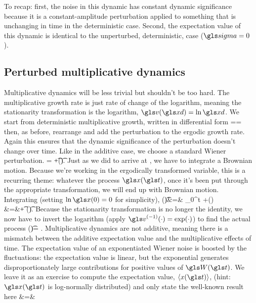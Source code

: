 To recap: first, the noise in this dynamic has constant dynamic significance because it is a constant-amplitude perturbation applied to 
something that is unchanging in time in the deterministic case. Second, the expectation value of this dynamic is identical to 
the unperturbed, deterministic, case ($\gsigma=0$).

\subsection{Perturbed multiplicative dynamics} 
Multiplicative dynamics will be less trivial but shouldn't be too hard. 
The multiplicative growth rate is just rate of change of the logarithm, meaning the stationarity transformation is the logarithm, $\gv(\xd)=\ln \xd$.
We start from deterministic multiplicative growth, written in differential form
\be
\gexp=\frac{\gd\ln \xd}{\gd\t}=\ggamma
{}
\ee
then, as before, rearrange and add the perturbation to the ergodic growth rate. Again this 
ensures that the dynamic significance of the perturbation doesn't change over time.
Like in the additive case, we choose a standard Wiener perturbation.
\bea
\gd \ln \x= \ggamma  \gd\t +\gsigma \gd \gW(\t).
\eea
Just as we did to arrive at , we have to integrate a Brownian motion. Because we're 
working in the ergodically transformed variable, this is a recurring theme: whatever the process 
$\x(\t)$, once it's been put through the appropriate transformation, we will end up with Brownian 
motion. Integrating  (setting $\ln \x(0)=0$ for simplicity),
\bea
\ln \x(\t)&=& \int_0^t \ggamma  \gd\gs +\gsigma \gd \gW(\gs)\\
&=&\ggamma \t + \gsigma \gW(\t).
\eea
Because the stationarity transformation is no longer the identity, we now have to invert the 
logarithm (apply $\gv^{(-1)}(\cdot)=\exp(\cdot)$) to find the actual process
\bea
\x(\t)= \exp\left[\ggamma \t + \gsigma \gW(\t)\right].
\eea
Multiplicative dynamics are not additive, meaning there is a mismatch between the additive 
expectation value and the multiplicative effects of time. The expectation value of an 
exponentiated Wiener noise is boosted by the fluctuations: the expectation value is linear, 
but the exponential generates disproportionately large contributions for positive values of 
$\gW(\t)$. We leave it as an exercise to compute the expectation value, $\ave{x(\t)}$, 
(hint: $\x(\t)$ is log-normally distributed) and only state the well-known result here
\bea
\ave{\x(\t)}&=&\ave{\exp\left[\ggamma \t + \gsigma \gW(\t)\right]}\\
